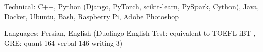 

\begin{cvskills}

  \cvskill
    {Technical:}
    {C++, Python (Django, PyTorch, scikit-learn, PySpark, Cython), Java, Docker, Ubuntu, Bash, Raspberry Pi, Adobe Photoshop}




  \cvskill
    {Languages:}
    {Persian, English (Duolingo English Test:  equivalent to TOEFL iBT  , GRE: quant 164 verbal 146 writing 3)} %

\end{cvskills}
